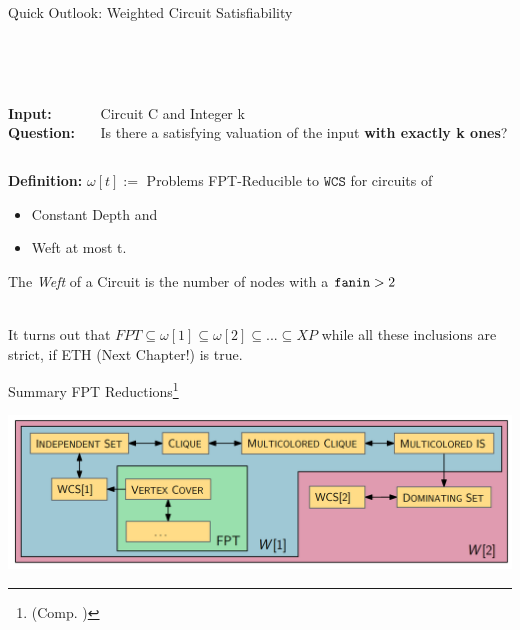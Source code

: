 \begin{frame}{Quick Outlook: Weighted Circuit Satisfiability}

\begin{tcolorbox}[colback=green!5,colframe=green!40!black,title=$\mathtt{WEIGHTED~CIRCUIT~SATISFIABILITY (WCS)}$ (\cite{Cygan2015})]
\begin{columns}[T] %
    \begin{column}{.18\textwidth}
    \\~
    
    \textbf{Input:}\\
    \textbf{Question:}
    \end{column}
    \begin{column}{.78\textwidth}
    \\~
    
    Circuit C and Integer k\\
    
    Is there a satisfying valuation of the input \textbf{with exactly k ones}?
    
    \end{column}
 \end{columns}

\end{tcolorbox}


\textbf{Definition: } $\omega[t] := $ Problems FPT-Reducible to $\mathtt{WCS}$ for circuits of 
\begin{itemize}
    \item Constant Depth and
    \item Weft at most t. 
\end{itemize}
The \textit{Weft} of a Circuit is the number of nodes with a $ \mathtt{fan\-in} > 2$
\\~

It turns out that $FPT \subseteq \omega[1] \subseteq \omega[2] \subseteq ... \subseteq XP$ while all these inclusions are strict, if ETH (Next Chapter!) is true.
\end{frame}


\begin{frame}[c]{Summary FPT Reductions\footnote{(Comp. \cite{fptland})}}
    \begin{center}
        \includegraphics[scale=0.3]{img/landscape.png}
    \end{center}
\end{frame}

